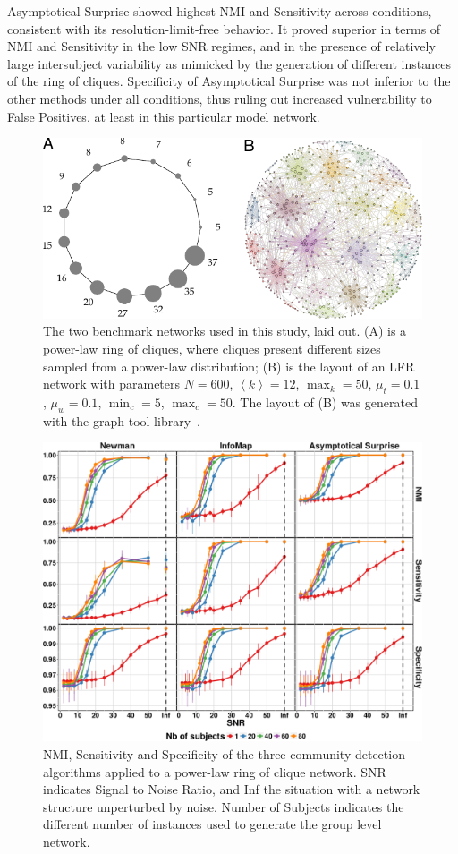Asymptotical Surprise showed highest NMI and Sensitivity across conditions, consistent with its resolution-limit-free behavior. It proved superior in terms of NMI and Sensitivity in the low SNR regimes, and in the presence of relatively large intersubject variability as mimicked by the generation of different instances of the ring of cliques.
Specificity of Asymptotical Surprise was not inferior to the other methods under all conditions, thus ruling out increased vulnerability to False Positives, at least in this particular model network.
\begin{figure}[htb!]
\includegraphics[width=1\textwidth]{images/pacopaperfigure1.pdf}
\caption{The two benchmark networks used in this study, laid out. (A) is a power-law ring of cliques, where cliques present different sizes sampled from a power-law distribution;
(B) is the layout of an LFR network with parameters $N=600$, $\left< k \right>=12$, $\max_k=50$, $\mu_t=0.1$, $\mu_w=0.1$, $\min_c=5$, $\max_c=50$.
The layout of (B) was generated with the graph-tool library~\cite{peixoto_graph_tool_2014}.}
\label{fig:lfrringclique}
\end{figure}
\begin{figure}[htb!]
\includegraphics[width=\textwidth]{images/pacopaperfigure4.pdf}
\caption{NMI, Sensitivity and Specificity of the three community detection algorithms applied to a power-law ring of clique network. SNR indicates Signal to Noise Ratio, and Inf the situation with a network structure unperturbed by noise. Number of Subjects indicates the different number of instances used to generate the group level network.}
\label{fig:nmisensitivityspecificityringclique}
\end{figure}
